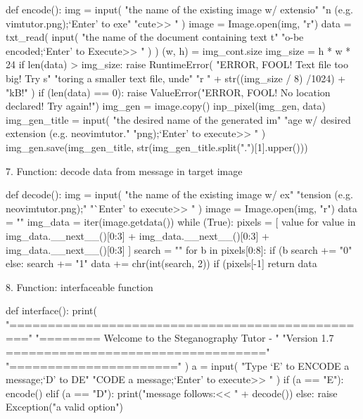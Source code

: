 \documentclass[11pt, english]{article}
\begin{document}
	{\small\begin{python}
	def encode():
	    img = input(
	        "\nType the name of the existing image w/ extensio"
                "n (e.g. vimtutor.png)\nthen;\nPress `Enter' to exe"
                "cute\n>> "
	    )
    	    image = Image.open(img, "r")
    	    data = txt_read(
                input(
                    "\nType the name of the document containing text t"
                    "o-be encoded\nthen;\nPress `Enter' to Execute\n>> "
        	)
    	    )
	    (w, h) = img_cont.size
	    img_size = h * w * 24
	    if len(data) > img_size:
	        raise RuntimeError(
		    "\nFATAL ERROR, FOOL! Text file too big! Try s"
		    "toring a smaller text file, unde"
		    "r " + str((img_size / 8) /1024) + "kB!"
		)
    	    if (len(data) == 0):
                raise ValueError("\nFATAL ERROR, FOOL! No location declared! Try again!")
    	    img_gen = image.copy()
    	    inp_pixel(img_gen, data)
	    img_gen_title = input(
                "\nType the desired name of the generated im"
                "age w/ desired extension (e.g. neovimtutor."
                "png)\nthen;\nPress `Enter' to execute\n>> "
    	    )
    	    img_gen.save(img_gen_title, str(img_gen_title.split(".")[1].upper()))
	\end{python}}

	7. Function: decode data from message in target image

	{\small\begin{python}
	def decode():
    	    img = input(
                "\nType the name of the existing image w/ ex"
                "tension (e.g. neovimtutor.png)\nthen;\nPress "
        	"`Enter' to execute\n>> "
    	    )
	    image = Image.open(img, "r")
    	    data = ""
    	    img_data = iter(image.getdata())
    	    while (True):
                pixels = [
                    value for value in img_data.__next__()[0:3] +
            	    img_data.__next__()[0:3] +
            	    img_data.__next__()[0:3]
        	]
        	search = ""
		for b in pixels[0:8]:
            	    if (b %
                        search += "0"
            	    else:
                        search += "1"
        	data += chr(int(search, 2))
        	if (pixels[-1] %
            	    return data
	\end{python}}

	8. Function: interfaceable function

	{\small\begin{python}
	def interface():
	    print(
                "================================================"
        	"======\n== Welcome to the Steganography Tutor - "
        	"Version 1.7 ==\n================================"
        	"======================\n"
    	    )
    	    a = input(
        	"Type `E' to ENCODE a message\nor;\nType `D' to DE"
        	"CODE a message\nthen;\nPress `Enter' to execute\n>> "
    	    )
    	    if (a == "E"):
                encode()
    	    elif (a == "D"):
	        print("\nDecoded message follows:\n<< " + decode())
    	    else:
                raise Exception("\nChoose a valid option")
	\end{python}}
\end{document}
